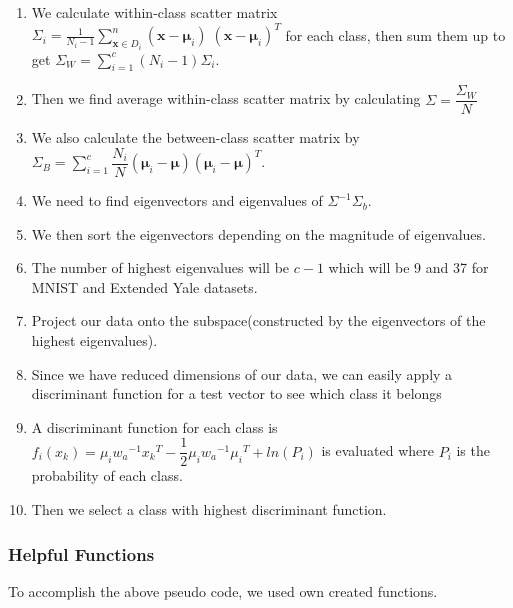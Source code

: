 \begin{enumerate}
	
	\item We calculate within-class scatter matrix $\Sigma_i = \frac{1}{N_{i}-1} \sum\limits_{\pmb x \in D_i}^n (\pmb x - \pmb \mu_i)\;(\pmb x - \pmb \mu_i)^T$ for each class, then sum them up to get $\Sigma_W = \sum\limits_{i =1}^{c} (N_i - 1) \Sigma_i $.
	\item Then we find average within-class scatter matrix by calculating $\Sigma =\dfrac{\Sigma_W}{N}$
	\item We also calculate the between-class scatter matrix by $\Sigma_B = \sum\limits_{i =1}^c \dfrac{N_i}{N} (\pmb \mu_i - \pmb \mu) (\pmb \mu_i - \pmb \mu)^T$.
	\item We need to find eigenvectors and eigenvalues of $\Sigma^{-1} \Sigma_b$.
	\item We then sort the eigenvectors depending on the magnitude of eigenvalues.
	\item The number of highest eigenvalues will be $c-1$ which will be 9 and 37 for MNIST and Extended Yale datasets.
	\item Project our data onto the subspace(constructed by the eigenvectors of the highest eigenvalues).
	\item Since we have reduced dimensions of our data, we can easily apply a discriminant function for a test vector to see which class it belongs
	\item A discriminant function for each class is $f_i(x_k) = \mu_i {w_a}^{-1} {x_k}^T - \dfrac{1}{2} \mu_i {w_a}^{-1} {\mu_i}^T + ln(P_i)$ is evaluated where $P_i$ is the probability of each class.
	\item Then we select a class with highest discriminant function.
\end{enumerate}
\subsubsection{Helpful Functions}
To accomplish the above pseudo code, we used own created functions.
